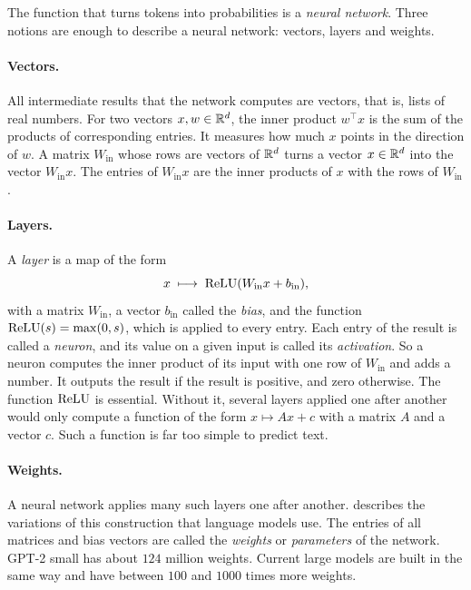 The function that turns tokens into probabilities is a \emph{neural network}. Three notions are enough to
describe a neural network: vectors, layers and weights.

\paragraph{Vectors.} All intermediate results that the network computes are vectors, that is, lists of real
numbers. For two vectors $x,w\in\mathbb{R}^d$, the inner product $w^\top x$ is the sum of the products of corresponding
entries. It measures how much $x$ points in the direction of $w$. A matrix $W_{\mathrm{in}}$ whose rows are
vectors of $\mathbb{R}^d$ turns a vector $x\in\mathbb{R}^d$ into the vector $W_{\mathrm{in}}x$. The entries of
$W_{\mathrm{in}}x$ are the inner products of $x$ with the rows of $W_{\mathrm{in}}$.

\paragraph{Layers.} A \emph{layer} is a map of the form
\begin{equation}\label{eq:layer}
x \;\longmapsto\; \mathrm{ReLU}(W_{\mathrm{in}}x+b_{\mathrm{in}}),
\end{equation}
with a matrix $W_{\mathrm{in}}$, a vector $b_{\mathrm{in}}$ called the \emph{bias}, and the function
$\mathrm{ReLU}(s)=\max(0,s)$, which is applied to every entry. Each entry of the result is called a \emph{neuron}, and its
value on a given input is called its \emph{activation}. So a neuron computes the inner product of its input with
one row of $W_{\mathrm{in}}$ and adds a number. It outputs the result if the result is positive, and zero
otherwise. The function $\mathrm{ReLU}$ is essential. Without it, several layers applied one after another would only
compute a function of the form $x\mapsto Ax+c$ with a matrix $A$ and a vector $c$. Such a function is far too
simple to predict text.

\paragraph{Weights.} A neural network applies many such layers one after another.  describes
the variations of this construction that language models use. The entries of all matrices and bias vectors are
called the \emph{weights} or \emph{parameters} of the network. GPT-2 small has about $124$ million weights.
Current large models are built in the same way and have between $100$ and $1000$ times more weights.

